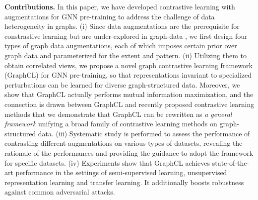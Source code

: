\textbf{Contributions.}
In this paper, we have developed contrastive learning with augmentations for GNN pre-training to address the challenge of data heterogeneity in graphs.
(i) Since data augmentations are the prerequisite for constrastive learning but are under-explored in graph-data \cite{verma2019graphmix}, we first design four types of graph data augmentations, each of which imposes certain prior over graph data and parameterized for the extent and pattern.
(ii) Utilizing them to obtain correlated views, we propose a novel graph contrastive learning framework (GraphCL) for GNN pre-training,
so that representations invariant to specialized perturbations can be learned for diverse graph-structured data.
Moreover, we show that GraphCL actually performs mutual information maximization, and the connection is drawn between GraphCL and recently proposed contrastive learning methods that we demonstrate that GraphCL can be rewritten as \textit{a general framework} unifying a broad family of contrastive learning methods on graph-structured data.
(iii) Systematic study is performed to assess the performance of contrasting different augmentations on various types of datasets, revealing the rationale of the performances and providing the guidance to adopt the framework for specific datasets.
(iv) Experiments show that GraphCL achieves state-of-the-art performance in the settings of semi-supervised learning, unsupervised representation learning and transfer learning. It additionally boosts robustness against common adversarial attacks. 

